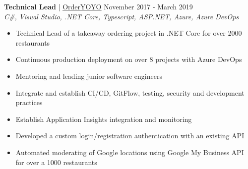 \documentclass[margin, 10pt, hidelinks]{res} %
\newcommand{\emphasize}{\bf} %
\begin{document}
\begin{resume}
    {\emphasize Technical Lead} | \href{https://orderyoyo.com/}{\underline{OrderYOYO}}    \hfill November 2017 - March 2019  \\
    {\it C\#, Visual Studio, .NET Core, Typescript, ASP.NET, Azure, Azure DevOps} %
    \begin{itemize} \setlength{\itemindent}{-0.1in}\itemsep 0pt %
        \item Technical Lead of a takeaway ordering project in .NET Core for over 2000 restaurants
        \item Continuous production deployment on over 8 projects with Azure DevOps
        \item Mentoring and leading junior software engineers
        \item Integrate and establish  CI/CD, GitFlow, testing, security and development practices
        \item Establish Application Insights integration and monitoring
        \item Developed a custom login/registration authentication with an existing API
        \item Automated moderating of Google locations using Google My Business API for over a 1000 restaurants
    \end{itemize}



\end{resume}
\end{document}
